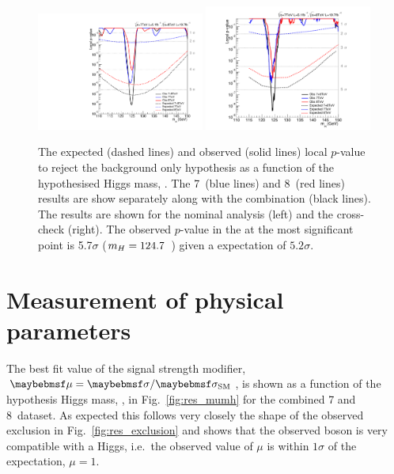 \begin{figure}
  \includegraphics[width=0.49\textwidth]{results/plots/mva_pval.pdf}
  \includegraphics[width=0.49\textwidth]{results/plots/sideband_pval_fix.pdf}
  \caption[The expected and observed local $p$-value to reject the background hypothesis]{The expected (dashed lines) and observed (solid lines) local $p$-value to reject the background only hypothesis as a function of the hypothesised Higgs mass, \mH. The 7~\TeV (blue lines) and 8~\TeV (red lines) results are show separately along with the combination (black lines). The results are shown for the nominal \MFM analysis (left) and the cross-check \SMVA (right). The observed $p$-value in the \MFM at the most significant point is 5.7$\sigma$ ($m_{H}=124.7$~\GeV) given a \SM expectation of $5.2\sigma$.}
  \label{fig:res_pvalue}
\end{figure}

\section{Measurement of physical parameters}

The best fit value of the signal strength modifier, $\mu=\musm$, is shown as a function of the hypothesis Higgs mass, \mH, in Fig.~\ref{fig:res_mumh} for the combined 7 and 8~\TeV dataset. As expected this follows very closely the shape of the observed exclusion in Fig.~\ref{fig:res_exclusion} and shows that the observed boson is very compatible with a \SM Higgs, i.e.~the observed value of $\mu$ is within $1\sigma$ of the \SM expectation, $\mu=1$. 

